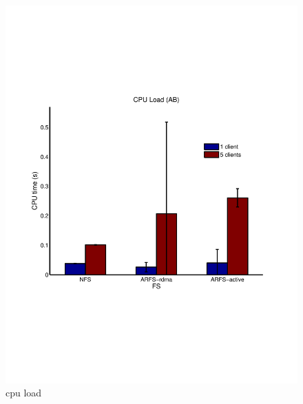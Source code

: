 \documentclass[10pt]{article}
\begin{document}
\begin{itemize}
\begin{itemize}
\begin{figure}
  \centering
\includegraphics[scale=0.5, trim = 0 200 0 200]{../../results/matlab/cpuload.pdf}
  \caption{cpu load}\label{cpuload}
\end{figure}


\end{itemize}
\end{itemize}
\end{document}
